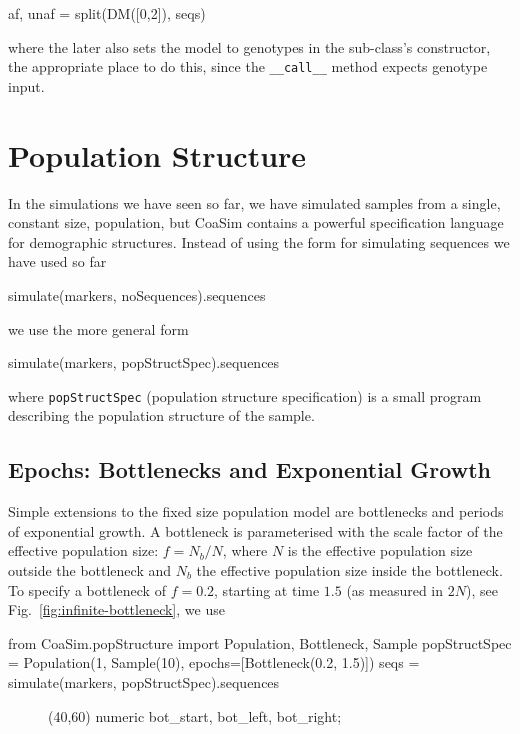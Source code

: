 \documentclass{manual}
\begin{document}
\begin{empfile}
\begin{code}
af, unaf = split(DM([0,2]), seqs)
\end{code}
where the later also sets the model to genotypes in the sub-class's
constructor, the appropriate place to do this, since the
\texttt{\_\_call\_\_} method expects genotype input.

\section{Population Structure}
\label{sec:pop-structure}

In the simulations we have seen so far, we have simulated samples from
a single, constant size, population, but CoaSim contains a powerful
specification language for demographic structures.  Instead of using
the form for simulating sequences we have used so far
\begin{code}
simulate(markers, noSequences).sequences
\end{code}
we use the more general form
\begin{code}
simulate(markers, popStructSpec).sequences
\end{code}
where \texttt{popStructSpec} (population structure specification) is a
small program describing the population structure of the sample.


\subsection{Epochs: Bottlenecks and Exponential Growth}
\label{sec:epochs}

Simple extensions to the fixed size population model are bottlenecks
and periods of exponential growth.  A bottleneck is parameterised with
the scale factor of the effective population size: $f=N_b/N$, where
$N$ is the effective population size outside the bottleneck and $N_b$
the effective population size inside the bottleneck.  To specify a
bottleneck of $f=0.2$, starting at time $1.5$ (as measured in $2N$),
see Fig.~\ref{fig:infinite-bottleneck}, we use
\begin{code}
from CoaSim.popStructure import Population, Bottleneck, Sample
popStructSpec = Population(1, Sample(10), 
                           epochs=[Bottleneck(0.2, 1.5)])
seqs = simulate(markers, popStructSpec).sequences
\end{code}

\begin{figure}[t]
  \begin{empdef}(40,60)
    numeric bot_start, bot_left, bot_right;
  

\end{empdef}
\end{figure}
\end{empfile}
\end{document}
